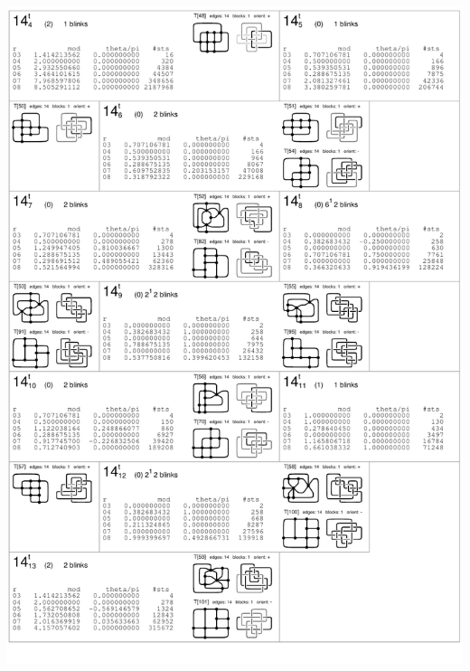 \begin{center}
 \includegraphics[height=23.5cm]{E.figsbw2/con3catalog004_bw.pdf} \eject 

\end{center}
